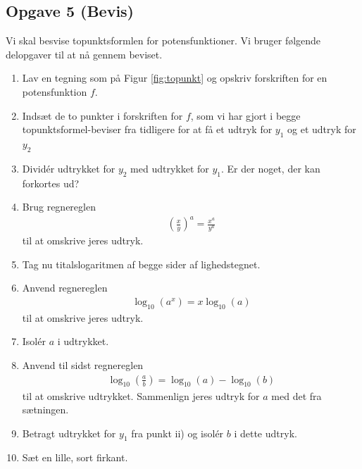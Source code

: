 \subsection*{Opgave 5 (Bevis)}
Vi skal besvise topunktsformlen for potensfunktioner. Vi bruger følgende delopgaver til at nå gennem beviset.
\begin{enumerate}[label=\roman*)]
	\item Lav en tegning som på Figur \ref{fig:topunkt} og opskriv forskriften for en potensfunktion $f$.
	\item Indsæt de to punkter i forskriften for $f$, som vi har gjort i begge topunktsformel-beviser fra 
	tidligere for at få et udtryk for $y_1$ og et udtryk for $y_2$
	\item Dividér udtrykket for $y_2$ med udtrykket for $y_1$. Er der noget, der kan forkortes ud?
	\item Brug regnereglen
	\begin{align*}
		\left(\frac{x}{y}\right)^a = \frac{x^a}{y^a}
	\end{align*}
	til at omskrive jeres udtryk.
	\item Tag nu titalslogaritmen af begge sider af lighedstegnet.
	\item Anvend regnereglen 
	\begin{align*}
		\log_{10}(a^x) = x\log_{10}(a)
	\end{align*}
	til at omskrive jeres udtryk.
	\item Isolér $a$ i udtrykket.
	\item Anvend til sidst regnereglen 
	\begin{align*}
		\log_{10}\left(\frac{a}{b}\right) = \log_{10}(a)-\log_{10}(b)
	\end{align*}
	til at omskrive udtrykket. Sammenlign jeres udtryk for $a$ med det fra sætningen. 
	\item Betragt udtrykket for $y_1$ fra punkt ii) og isolér $b$ i dette udtryk.
	\item Sæt en lille, sort firkant.
\end{enumerate} 